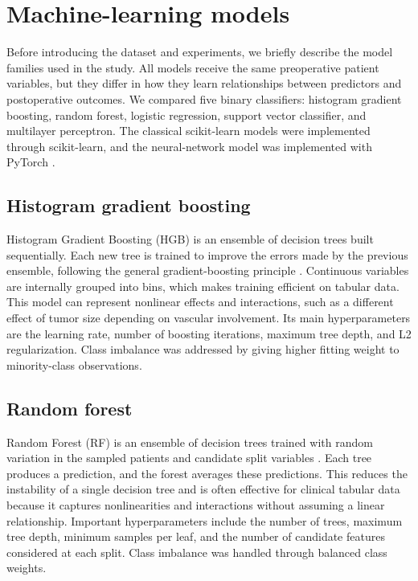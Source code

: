 \documentclass[11pt,a4paper]{article}
\begin{document}
\section{Machine-learning models}

Before introducing the dataset and experiments, we briefly describe the model families used in the study. All models receive the same preoperative patient variables, but they differ in how they learn relationships between predictors and postoperative outcomes. We compared five binary classifiers: histogram gradient boosting, random forest, logistic regression, support vector classifier, and multilayer perceptron. The classical scikit-learn models were implemented through scikit-learn, and the neural-network model was implemented with PyTorch \cite{pedregosa2011scikit,paszke2019pytorch}.

\subsection{Histogram gradient boosting}

Histogram Gradient Boosting (HGB) is an ensemble of decision trees built sequentially. Each new tree is trained to improve the errors made by the previous ensemble, following the general gradient-boosting principle \cite{friedman2001gradientboosting}. Continuous variables are internally grouped into bins, which makes training efficient on tabular data. This model can represent nonlinear effects and interactions, such as a different effect of tumor size depending on vascular involvement. Its main hyperparameters are the learning rate, number of boosting iterations, maximum tree depth, and L2 regularization. Class imbalance was addressed by giving higher fitting weight to minority-class observations.

\subsection{Random forest}

Random Forest (RF) is an ensemble of decision trees trained with random variation in the sampled patients and candidate split variables \cite{breiman2001randomforests}. Each tree produces a prediction, and the forest averages these predictions. This reduces the instability of a single decision tree and is often effective for clinical tabular data because it captures nonlinearities and interactions without assuming a linear relationship. Important hyperparameters include the number of trees, maximum tree depth, minimum samples per leaf, and the number of candidate features considered at each split. Class imbalance was handled through balanced class weights.
\end{document}
